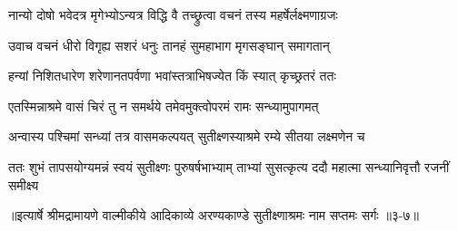 \twolineshloka
{नान्यो दोषो भवेदत्र मृगेभ्योऽन्यत्र विद्धि वै}
{तच्छ्रुत्वा वचनं तस्य महर्षेर्लक्ष्मणाग्रजः} %

\twolineshloka
{उवाच वचनं धीरो विगृह्य सशरं धनुः}
{तानहं सुमहाभाग मृगसङ्घान् समागतान्} %

\twolineshloka
{हन्यां निशितधारेण शरेणानतपर्वणा}
{भवांस्तत्राभिषज्येत किं स्यात् कृच्छ्रतरं ततः} %

\twolineshloka
{एतस्मिन्नाश्रमे वासं चिरं तु न समर्थये}
{तमेवमुक्त्वोपरमं रामः सन्ध्यामुपागमत्} %

\twolineshloka
{अन्वास्य पश्चिमां सन्ध्यां तत्र वासमकल्पयत्}
{सुतीक्ष्णस्याश्रमे रम्ये सीतया लक्ष्मणेन च} %

\twolineshloka
{ततः शुभं तापसयोग्यमन्नं स्वयं सुतीक्ष्णः पुरुषर्षभाभ्याम्}
{ताभ्यां सुसत्कृत्य ददौ महात्मा सन्ध्यानिवृत्तौ रजनीं समीक्ष्य} %


॥इत्यार्षे श्रीमद्रामायणे वाल्मीकीये आदिकाव्ये अरण्यकाण्डे सुतीक्ष्णाश्रमः नाम सप्तमः सर्गः ॥३-७॥
